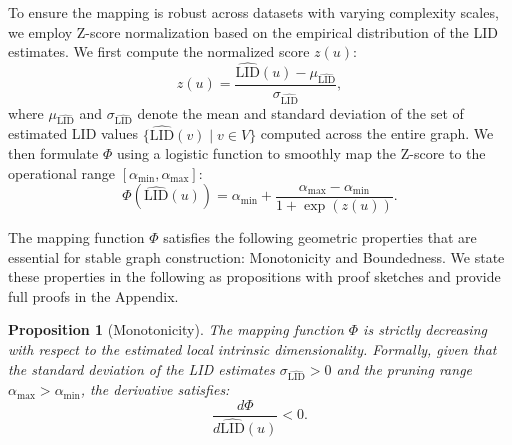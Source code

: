 \documentclass{article}
\theoremstyle{plain}
\newtheorem{proposition}[theorem]{Proposition}
\theoremstyle{definition}
\theoremstyle{remark}
\begin{document}
To ensure the mapping is robust across datasets with varying complexity scales, we employ Z-score normalization based on the empirical distribution of the LID estimates. We first compute the normalized score $z(u)$:
\begin{equation}
    z(u) = \frac{\widehat{\text{LID}}(u) - \mu_{\widehat{\text{LID}}}}{\sigma_{\widehat{\text{LID}}}},
\end{equation}
where $\mu_{\widehat{\text{LID}}}$ and $\sigma_{\widehat{\text{LID}}}$ denote the mean and standard deviation of the set of estimated LID values $\{ \widehat{\text{LID}}(v) \mid v \in V \}$ computed across the entire graph.
We then formulate $\Phi$ using a logistic function to smoothly map the Z-score to the operational range $[\alpha_{\min}, \alpha_{\max}]$:
\begin{equation}
    \Phi(\widehat{\text{LID}}(u)) = \alpha_{\min} + \frac{\alpha_{\max} - \alpha_{\min}}{1 + \exp(z(u))}.
\end{equation}


The mapping function $\Phi$ satisfies the following geometric properties that are essential for stable graph construction: Monotonicity and Boundedness. We state these properties in the following as propositions with proof sketches and provide full proofs in the Appendix.

\begin{proposition}[Monotonicity]
\label{prop:monotonicity}
The mapping function $\Phi$ is strictly decreasing with respect to the estimated local intrinsic dimensionality. Formally, given that the standard deviation of the LID estimates $\sigma_{\widehat{\text{LID}}} > 0$ and the pruning range $\alpha_{\max} > \alpha_{\min}$, the derivative satisfies:
\begin{equation}
    \frac{d \Phi}{d \widehat{\text{LID}}(u)} < 0.
\end{equation}
\end{proposition}
\end{document}
